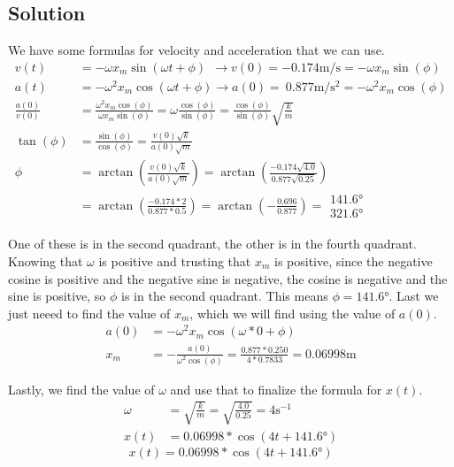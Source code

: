 \documentclass[12pt]{article}
\begin{document}
\subsection{Solution}
We have some formulas for velocity and acceleration that we can use.
\begin{align}
    v(t)    &=  -\omega x_m \sin(\omega t + \phi)\ \ \rightarrow
    v(0)    =   -0.174 \unit{\meter/\second}
        =   -\omega x_m \sin(\phi)\\
    a(t)    &=  -\omega^2 x_m \cos(\omega t + \phi)\rightarrow
    a(0)    =   \ 0.877 \unit{\meter/\second^2}
        =   -\omega^2 x_m \cos(\phi)\\
    \frac{a(0)}{v(0)}   &=  \frac{\omega^2 x_m \cos(\phi)}{\omega x_m \sin(\phi)}
        =   \omega\frac{\cos(\phi)}{\sin(\phi)}
        =   \frac{\cos(\phi)}{\sin(\phi)}\sqrt{\frac{k}{m}}\\
    \tan(\phi)  &=  \frac{\sin(\phi)}{\cos(\phi)}
        =   \frac{v(0)\sqrt{k}}{a(0)\sqrt{m}}\\
    \phi    &=  \arctan\left(\frac{v(0)\sqrt{k}}{a(0)\sqrt{m}}\right)
        =   \arctan\left(\frac{-0.174\sqrt{4.0}}{0.877\sqrt{0.25}}\right)\\
        &=  \arctan\left(\frac{-0.174*2}{0.877*0.5}\right)
        =  \arctan\left(-\frac{0.696}{0.877}\right)
        =   \begin{matrix} 141.6\unit{\degree} \\ 321.6\unit{\degree} \end{matrix}
\end{align}

One of these is in the second quadrant, the other is in the fourth quadrant. Knowing that $\omega$ is positive and trusting that $x_m$ is positive, since the negative cosine is positive and the negative sine is negative, the cosine is negative and the sine is positive, so $\phi$ is in the second quadrant. This means $\phi = 141.6\unit{\degree}$. Last we just neeed to find the value of $x_m$, which we will find using the value of $a(0)$.
\begin{align}
    a(0)    &=  -\omega^2 x_m \cos(\omega*0 + \phi)\\
    x_m &=  -\frac{a(0)}{\omega^2\cos(\phi)}
        =   \frac{0.877*0.250}{4*0.7833}
        =   0.06998\unit{\meter}
\end{align}

Lastly, we find the value of $\omega$ and use that to finalize the formula for $x(t)$. 
\begin{align}
    \omega  &=  \sqrt{\frac{k}{m}}
        =   \sqrt{\frac{4.0}{0.25}}
        =   4\unit{\second^{-1}}\\
    x(t)    &=  0.06998*\cos(4t + 141.6\unit{\degree})
\end{align}
\begin{equation}
    \boxed{x(t) =  0.06998*\cos(4t + 141.6\unit{\degree})}
\end{equation}
\end{document}
